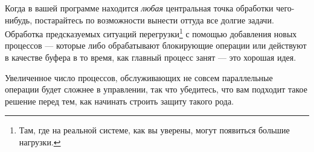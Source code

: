 Когда в вашей программе находится \emph{любая} центральная точка обработки чего-нибудь, постарайтесь по возможности вынести оттуда все долгие задачи. Обработка предсказуемых ситуаций перегрузки\footnote{Там, где на реальной системе, как вы уверены, могут появиться большие нагрузки.} с помощью добавления новых процессов --- которые либо обрабатывают блокирующие операции или действуют в качестве буфера в то время, как главный процесс занят --- это хорошая идея.

Увеличенное число процессов, обслуживающих не совсем параллельные операции будет сложнее в управлении, так что убедитесь, что вам подходит такое решение перед тем, как начинать строить защиту такого рода.

